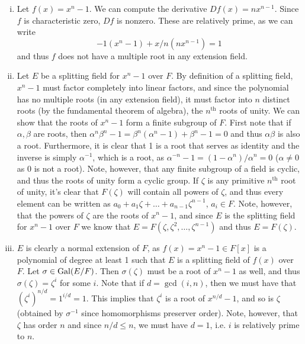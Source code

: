 \documentclass{../../mathnotes}
\begin{document}
\begin{enumerate}[(i)]
    \item Let $f(x)=x^n-1$. We can compute the derivative $Df(x)=nx^{n-1}$. Since $f$ is characteristic zero,
        $Df$ is nonzero. These are relatively prime, as we can write
        \[-1(x^n-1)+x/n(nx^{n-1})=1\]
        and thus $f$ does not have a multiple root in any extension field.
    \item Let $E$ be a splitting field for $x^n-1$ over $F$. By definition of a splitting field,
        $x^n-1$ must factor completely into linear factors, and since the polynomial has no multiple roots
        (in any extension field), it must factor into $n$ distinct roots (by the fundamental theorem of algebra),
        the $n^\text{th}$ roots of unity. 
        We can show that the roots of $x^n-1$ form a finite subgroup of $F$. First note that if $\alpha,\beta$ are roots,
        then $\alpha^n\beta^n-1=\beta^n(\alpha^n-1)+\beta^n-1=0$ and thus $\alpha\beta$ is also a root. Furthermore,
        it is clear that 1 is a root that serves as identity and the inverse is simply $\alpha^{-1}$, which is a root, as
        $\alpha^{-n}-1=(1-\alpha^n)/\alpha^n=0$ ($\alpha\neq 0$ as 0 is not a root). Note, however, that any
        finite subgroup of a field is cyclic, and thus the roots of unity form a cyclic group.
        If $\zeta$ is any primitive $n^\text{th}$ root of unity, it's clear that $F(\zeta)$ will contain all
        powers of $\zeta$, and thus every element can be written as $a_0+a_1\zeta+\ldots+a_{n-1}\zeta^{n-1}$, $a_i\in F$. Note, however,
        that the powers of $\zeta$ are the roots of $x^n-1$, and since $E$ is the splitting field for $x^n-1$ over $F$
        we know that $E=F(\zeta,\zeta^2,\ldots,\zeta^{n-1})$ and thus $E=F(\zeta)$.
    \item $E$ is clearly a normal extension of $F$, as $f(x)=x^n-1\in F[x]$ is a polynomial of degree at least 1 such that
        $E$ is a splitting field of $f(x)$ over $F$. Let $\sigma\in\operatorname{Gal}(E/F)$. Then $\sigma(\zeta)$ must be a root of
        $x^n-1$ as well, and thus $\sigma(\zeta)=\zeta^i$ for some $i$. Note that if $d=\gcd(i,n)$, then we
        must have that $(\zeta^i)^{n/d}=1^{i/d}=1$. This implies that $\zeta^i$ is a root of $x^{n/d}-1$, and so is $\zeta$
        (obtained by $\sigma^{-1}$ since homomorphisms preserver order). Note, however, that $\zeta$ has order $n$ and since $n/d\leq n$, we must have $d=1$,
        i.e. $i$ is relatively prime to $n$.
        

\end{enumerate}
\end{document}
